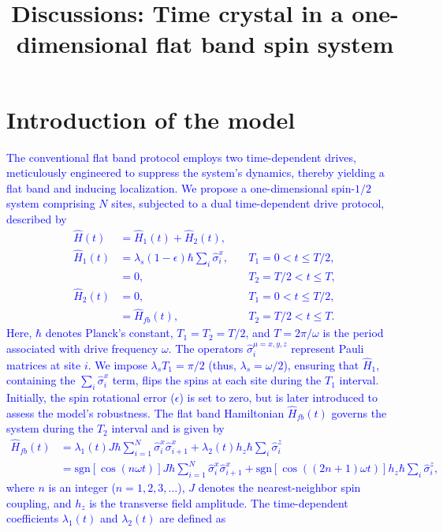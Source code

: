 \documentclass[a4paper,10pt]{article}
\title{Discussions: Time crystal in a one-dimensional flat band spin system}
\newcommand{\blue}[1]{\textcolor{blue}{#1}}
\begin{document}
\maketitle
\tableofcontents
\newpage

\section{Introduction of the model}
\blue{The conventional flat band protocol employs two time-dependent drives, meticulously engineered to suppress the system's dynamics, thereby yielding a flat band and inducing localization. We propose a one-dimensional spin-$1/2$ system comprising $N$ sites, subjected to a dual time-dependent drive protocol, described by
\begin{align}
    \hat{H}(t) &= \hat{H}_1(t) + \hat{H}_2(t),\\
    \hat{H}_1(t) &= \lambda_s (1-\epsilon) \hbar \sum_i \hat{\sigma}^x_i, &\quad T_1 = 0<t \le T/2, \\
            &= 0, &\quad T_2 = T/2<t \le T, \\
    \hat{H}_2(t) &= 0, &\quad T_1 = 0<t \le T/2, \\
     &= \hat{H}_{fb}(t), &\quad T_2  = T/2<t \le T.
\end{align}
Here, $\hbar$ denotes Planck's constant, $T_1 = T_2 = T/2$, and $T = 2\pi/\omega$ is the period associated with drive frequency $\omega$. The operators $\hat{\sigma}^{\mu=x,y,z}_i$ represent Pauli matrices at site $i$. We impose $\lambda_s T_1 = \pi/2$ (thus, $\lambda_s = \omega/2$), ensuring that $\hat{H}_1$, containing the $\sum_i \hat{\sigma}^x_i$ term, flips the spins at each site during the $T_1$ interval. Initially, the spin rotational error ($\epsilon$) is set to zero, but is later introduced to assess the model's robustness. The flat band Hamiltonian $\hat{H}_{fb}(t)$ governs the system during the $T_2$ interval and is given by
\begin{align}
    \hat{H}_{fb}(t) &= \lambda_1 (t) J \hbar\sum_{i=1}^{N} \hat{\sigma}_i^x \hat{\sigma}_{i+1}^x + \lambda_2 (t) h_z \hbar \sum_i \hat{\sigma}_i^z\\
     &= \mathrm{sgn}[\cos(n\omega t)] J \hbar\sum_{i=1}^{N} \hat{\sigma}_i^x \hat{\sigma}_{i+1}^x + \mathrm{sgn}[\cos((2n+1)\omega t)] h_z \hbar\sum_i \hat{\sigma}_i^z ,
\end{align}
where $n$ is an integer ($n = 1, 2, 3, \dots$), $J$ denotes the nearest-neighbor spin coupling, and $h_z$ is the transverse field amplitude. The time-dependent coefficients $\lambda_1(t)$ and $\lambda_2(t)$ are defined as
}
\end{document}
